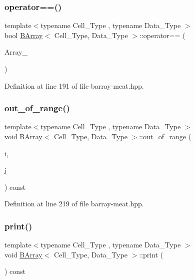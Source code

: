 \subsubsection{\texorpdfstring{operator==()}{operator==()}}
{\footnotesize\ttfamily template$<$typename Cell\+\_\+\+Type , typename Data\+\_\+\+Type $>$ \\
bool \hyperlink{class_b_array}{B\+Array}$<$ Cell\+\_\+\+Type, Data\+\_\+\+Type $>$\+::operator== (\begin{DoxyParamCaption}\item[{const \hyperlink{class_b_array}{B\+Array}$<$ Cell\+\_\+\+Type, Data\+\_\+\+Type $>$ \&}]{Array\+\_\+ }\end{DoxyParamCaption})\hspace{0.3cm}{\ttfamily [inline]}}



Definition at line 191 of file barray-\/meat.\+hpp.

\mbox{\label{class_b_array_a87bad4dcad82009d5721d21808b7e469}} 
\subsubsection{\texorpdfstring{out\+\_\+of\+\_\+range()}{out\_of\_range()}}
{\footnotesize\ttfamily template$<$typename Cell\+\_\+\+Type , typename Data\+\_\+\+Type $>$ \\
void \hyperlink{class_b_array}{B\+Array}$<$ Cell\+\_\+\+Type, Data\+\_\+\+Type $>$\+::out\+\_\+of\+\_\+range (\begin{DoxyParamCaption}\item[{\hyperlink{typedefs_8hpp_a91ad9478d81a7aaf2593e8d9c3d06a14}{uint}}]{i,  }\item[{\hyperlink{typedefs_8hpp_a91ad9478d81a7aaf2593e8d9c3d06a14}{uint}}]{j }\end{DoxyParamCaption}) const\hspace{0.3cm}{\ttfamily [inline]}}



Definition at line 219 of file barray-\/meat.\+hpp.

\mbox{\label{class_b_array_a9d150c44b23cf1e4af45f540508db1de}} 
\subsubsection{\texorpdfstring{print()}{print()}}
{\footnotesize\ttfamily template$<$typename Cell\+\_\+\+Type , typename Data\+\_\+\+Type $>$ \\
void \hyperlink{class_b_array}{B\+Array}$<$ Cell\+\_\+\+Type, Data\+\_\+\+Type $>$\+::print (\begin{DoxyParamCaption}{ }\end{DoxyParamCaption}) const\hspace{0.3cm}{\ttfamily [inline]}}




